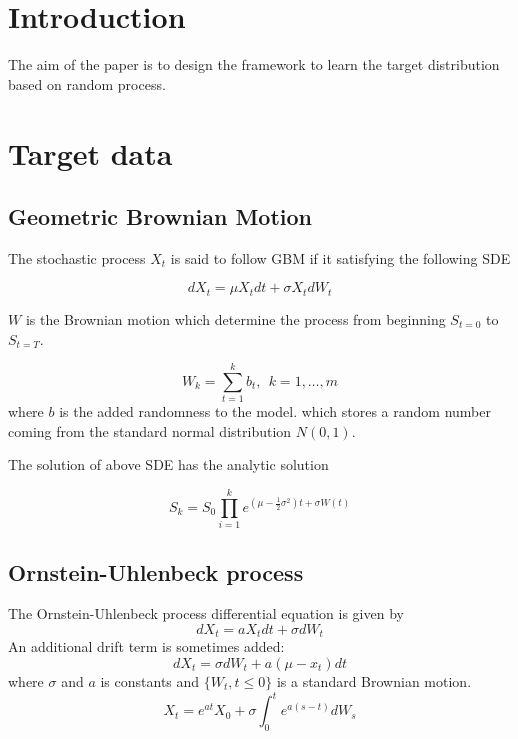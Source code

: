 \documentclass{article}
\begin{document}
		\section{Introduction}
		The aim of the paper is to design the framework to learn the target distribution based on random process.
		
		\section{Target data}
		\subsection{Geometric Brownian Motion}
		
				The stochastic process $X_t$ is said to follow GBM if it satisfying the following SDE
				
				\begin{equation}
					dX_t = \mu X_tdt + \sigma X_t dW_t 
				\end{equation}
				
				$W$ is the Brownian motion which determine the process from beginning $S_{t=0}$ to $S_{t=T}$.
				
				\begin{equation}
					W_{k} = \sum_{t=1}^{k} b_{t}, \ \ k = 1, \dots, m
				\end{equation}
				 where $b$ is the added randomness to the model.
				 which stores a random number coming from the standard normal distribution $N(0, 1)$.
			
			The solution of above SDE has the analytic solution
			
			\begin{equation}
				S_{k} = S_{0} \prod_{i=1}^{k}e^{\left(\mu-\frac{1}{2}\sigma^{2}\right)t+\sigma W(t)}
				\label{eq:bm_process}
			\end{equation}
			
			
				
				
	
	\subsection{Ornstein-Uhlenbeck process}
	The Ornstein-Uhlenbeck process differential equation is given by
	\begin{equation}
		dX_t = aX_tdt + \sigma dW_t 
		\label{eq:ornuh_diff}
	\end{equation}
	An additional drift term is sometimes added:
	\begin{equation}
	dX_t = \sigma dW_t +a (\mu-x_t)dt
	\label{eq:ornuh_diff_mean}
	\end{equation}
	where $\sigma$ and $a$ is constants and $\{W_t, t \leq 0\}$ is a standard Brownian motion.
	\begin{equation}
		X_t = e^{at}X_0 + \sigma \int_{0}^{t}e^{a(s-t)}dW_s
			\end{equation}
	
\end{document}
